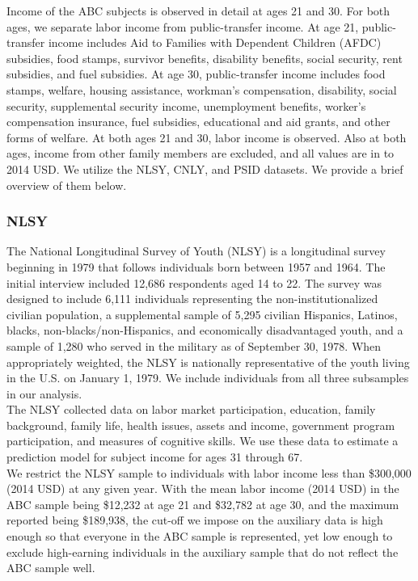 \noindent Income of the ABC subjects is observed in detail at ages 21 and 30. For both ages,
we separate labor income from public-transfer income. At age 21, public-transfer income includes Aid to
Families with Dependent Children (AFDC) subsidies, food stamps, survivor benefits, disability
benefits, social security, rent subsidies, and fuel subsidies. At age 30, public-transfer income includes food stamps, welfare, housing assistance, workman's
compensation, disability, social security, supplemental security income, unemployment benefits,
worker's compensation insurance, fuel subsidies, educational and aid grants, and other forms of welfare.
At both ages 21 and 30, labor income is observed. Also at both ages, income from other family members are excluded, and all values are in
to 2014 USD. We utilize the
NLSY, CNLY, and PSID datasets. We provide a brief overview of them below. \\

\subsubsection{NLSY}
\label{app:subject_income_nlsy}

\noindent The National Longitudinal Survey of Youth (NLSY) is a longitudinal survey beginning in 1979
that follows individuals born between 1957 and 1964. The initial interview included
12,686 respondents aged 14 to 22. The survey was designed to include 6,111
individuals representing the non-institutionalized civilian population, a supplemental
sample of 5,295 civilian Hispanics, Latinos, blacks, non-blacks/non-Hispanics, and economically
disadvantaged youth, and a sample of 1,280 who served in the military as of September 30,
1978. When appropriately weighted, the NLSY is nationally representative of the youth
living in the U.S. on January 1, 1979. We include individuals from all three subsamples
in our analysis. \\

\noindent The NLSY collected data on labor market participation, education, family background,
family life, health issues, assets and income, government program participation, and
measures of cognitive skills. We use these data to estimate a prediction model for
subject income for ages 31 through 67. \\

\noindent We restrict the NLSY sample to individuals with labor income less than
\$300,000 (2014 USD) at any given year. With the mean labor income (2014 USD) in the ABC
sample being \$12,232 at age 21 and \$32,782 at age 30, and the maximum reported
being \$189,938, the cut-off we impose on the auxiliary data is high enough
so that everyone in the ABC sample is represented, yet low enough to
exclude high-earning individuals in the auxiliary sample that do not reflect the ABC sample well. \\

